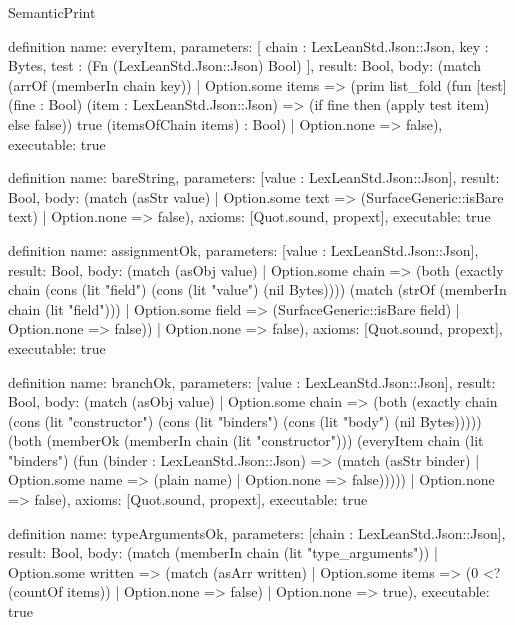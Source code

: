 \begin{lexlean}{SemanticPrint}
\begin{semanticmodule}
definition{
  name: everyItem,
  parameters: [
    chain : LexLeanStd.Json::Json,
    key : Bytes,
    test : (Fn (LexLeanStd.Json::Json) Bool)
  ],
  result: Bool,
  body: (match (arrOf (memberIn chain key))
    | Option.some items => (prim list_fold (fun [test] (fine : Bool) (item : LexLeanStd.Json::Json) => (if fine then (apply test item) else false)) true (itemsOfChain items) : Bool)
    | Option.none => false),
  executable: true
}

definition{
  name: bareString,
  parameters: [value : LexLeanStd.Json::Json],
  result: Bool,
  body: (match (asStr value)
    | Option.some text => (SurfaceGeneric::isBare text)
    | Option.none => false),
  axioms: [Quot.sound, propext],
  executable: true
}

definition{
  name: assignmentOk,
  parameters: [value : LexLeanStd.Json::Json],
  result: Bool,
  body: (match (asObj value)
    | Option.some chain => (both (exactly chain (cons (lit "field") (cons (lit "value") (nil Bytes)))) (match (strOf (memberIn chain (lit "field")))
      | Option.some field => (SurfaceGeneric::isBare field)
      | Option.none => false))
    | Option.none => false),
  axioms: [Quot.sound, propext],
  executable: true
}

definition{
  name: branchOk,
  parameters: [value : LexLeanStd.Json::Json],
  result: Bool,
  body: (match (asObj value)
    | Option.some chain => (both (exactly chain (cons (lit "constructor") (cons (lit "binders") (cons (lit "body") (nil Bytes))))) (both (memberOk (memberIn chain (lit "constructor"))) (everyItem chain (lit "binders") (fun (binder : LexLeanStd.Json::Json) => (match (asStr binder)
      | Option.some name => (plain name)
      | Option.none => false)))))
    | Option.none => false),
  axioms: [Quot.sound, propext],
  executable: true
}

definition{
  name: typeArgumentsOk,
  parameters: [chain : LexLeanStd.Json::Json],
  result: Bool,
  body: (match (memberIn chain (lit "type_arguments"))
    | Option.some written => (match (asArr written)
      | Option.some items => (0 <? (countOf items))
      | Option.none => false)
    | Option.none => true),
  executable: true
}


\end{semanticmodule}
\end{lexlean}
